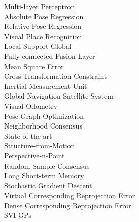 \begin{arc}
			{Multi-layer Perceptron } 		\\
			{Absolute Pose Regression} 		\\
			{Relative Pose Regression} 		\\
			{Visual Place Recognition} \\
			{Local Support Global} \\
			{Fully-connected Fusion Layer} \\
			{Mean Square Error} \\
			{Cross Transformation Constraint} \\
			{Inertial Measurement Unit} \\
			{Global Navigation Satellite System} \\
			{Visual Odometry} \\
			{Pose Graph Optimization} \\
			{Neighborhood Consensus} \\
			{State-of-the-art} \\
			{Structure-from-Motion} \\
			{Perspective-n-Point} \\
		{Random Sample Consensus} \\
			{Long Short-term Memory} \\
			{Stochastic Gradient Descent} \\
			{Virtual Corresponding Reprojection Error} \\
			{Dense Corresponding Reprojection Error} \\
	 {SVI GPs} \\
\end{arc}


